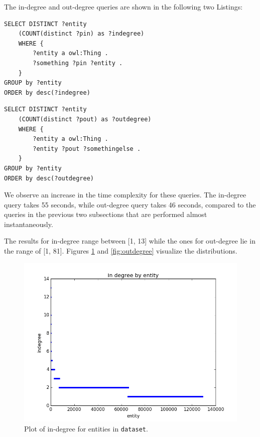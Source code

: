 \documentclass[runningheads,a4paper]{../../StyleFiles/llncs}
\begin{document}
The in-degree and out-degree queries are shown in the following two Listings:

\begin{lstlisting}[captionpos=b, caption=SPARQL query for calculating in degree of entities, label=lst:sparql, basicstyle=\ttfamily\small,frame=bt]
SELECT DISTINCT ?entity
	(COUNT(distinct ?pin) as ?indegree)
	WHERE { 
		?entity a owl:Thing .
		?something ?pin ?entity .
	}
GROUP by ?entity
ORDER by desc(?indegree)
\end{lstlisting}

\begin{lstlisting}[captionpos=b, caption=SPARQL query for calculating out degree of entities, label=lst:sparql, basicstyle=\ttfamily\small,frame=bt]
SELECT DISTINCT ?entity
	(COUNT(distinct ?pout) as ?outdegree)
	WHERE { 
		?entity a owl:Thing .
		?entity ?pout ?somethingelse .
	}
GROUP by ?entity
ORDER by desc(?outdegree)
\end{lstlisting}

We observe an increase in the time complexity for these queries. The in-degree query takes 55 seconds, while out-degree query takes 46 seconds, compared to the queries in the previous two subsections that are performed almost instantaneously. 

The results for in-degree range between [1, 13] while the ones for out-degree lie in the range of [1, 81]. Figures \ref{fig:indegree} and \ref{fig:outdegree} visualize the distributions.

\begin{figure}[h]
	\centering
	\includegraphics[width=.7\textwidth]{img/dataset_indegree.png}
	\caption{Plot of in-degree for entities in \texttt{dataset}.}
	\label{fig:indegree}
\end{figure}
\end{document}
